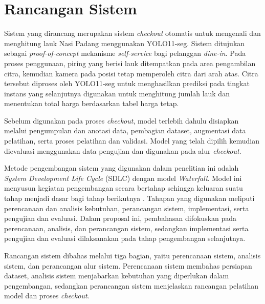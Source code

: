 \section{Rancangan Sistem}

Sistem yang dirancang merupakan sistem \textit{checkout} otomatis untuk mengenali dan menghitung lauk Nasi Padang menggunakan YOLO11-seg. Sistem ditujukan sebagai \textit{proof-of-concept} mekanisme \textit{self-service} bagi pelanggan \textit{dine-in}. Pada proses penggunaan, piring yang berisi lauk ditempatkan pada area pengambilan citra, kemudian kamera pada posisi tetap memperoleh citra dari arah atas. Citra tersebut diproses oleh YOLO11-seg untuk menghasilkan prediksi pada tingkat instans yang selanjutnya digunakan untuk menghitung jumlah lauk dan menentukan total harga berdasarkan tabel harga tetap.

Sebelum digunakan pada proses \textit{checkout}, model terlebih dahulu disiapkan melalui pengumpulan dan anotasi data, pembagian dataset, augmentasi data pelatihan, serta proses pelatihan dan validasi. Model yang telah dipilih kemudian dievaluasi menggunakan data pengujian dan digunakan pada alur \textit{checkout}.

Metode pengembangan sistem yang digunakan dalam penelitian ini adalah \textit{System Development Life Cycle} (SDLC) dengan model \textit{Waterfall}. Model ini menyusun kegiatan pengembangan secara bertahap sehingga keluaran suatu tahap menjadi dasar bagi tahap berikutnya \cite{sommerville2016}. Tahapan yang digunakan meliputi perencanaan dan analisis kebutuhan, perancangan sistem, implementasi, serta pengujian dan evaluasi. Dalam proposal ini, pembahasan difokuskan pada perencanaan, analisis, dan perancangan sistem, sedangkan implementasi serta pengujian dan evaluasi dilaksanakan pada tahap pengembangan selanjutnya.

Rancangan sistem dibahas melalui tiga bagian, yaitu perencanaan sistem, analisis sistem, dan perancangan alur sistem. Perencanaan sistem membahas persiapan dataset, analisis sistem menjabarkan kebutuhan yang diperlukan dalam pengembangan, sedangkan perancangan sistem menjelaskan rancangan pelatihan model dan proses \textit{checkout}.





